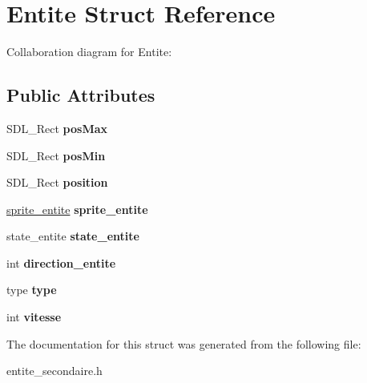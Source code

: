\hypertarget{structEntite}{}\section{Entite Struct Reference}
\label{structEntite}


Collaboration diagram for Entite\+:
\subsection*{Public Attributes}
\begin{DoxyCompactItemize}
\item 
\mbox{\label{structEntite_a9a50f732529d9d4fadb3f2a84f7c100e}} 
S\+D\+L\+\_\+\+Rect {\bfseries pos\+Max}
\item 
\mbox{\label{structEntite_a423bb0869194e380e2eeed768abc25e7}} 
S\+D\+L\+\_\+\+Rect {\bfseries pos\+Min}
\item 
\mbox{\label{structEntite_ab7d2d161df4c728b71096310110fc42f}} 
S\+D\+L\+\_\+\+Rect {\bfseries position}
\item 
\mbox{\label{structEntite_a02737936435247b355900e31b6f25a6a}} 
\hyperlink{structSprite__entite}{sprite\+\_\+entite} {\bfseries sprite\+\_\+entite}
\item 
\mbox{\label{structEntite_a1427b445875a07252153acfae59d5e29}} 
state\+\_\+entite {\bfseries state\+\_\+entite}
\item 
\mbox{\label{structEntite_aaf0a2ea54f84354fa8d31df7b20456d8}} 
int {\bfseries direction\+\_\+entite}
\item 
\mbox{\label{structEntite_a7a72d6d6556d3e526e3a2a5c197b17cd}} 
type {\bfseries type}
\item 
\mbox{\label{structEntite_a7b94da47ebaa582ad59e0b692a04b8fa}} 
int {\bfseries vitesse}
\end{DoxyCompactItemize}


The documentation for this struct was generated from the following file\+:\begin{DoxyCompactItemize}
\item 
entite\+\_\+secondaire.\+h\end{DoxyCompactItemize}
